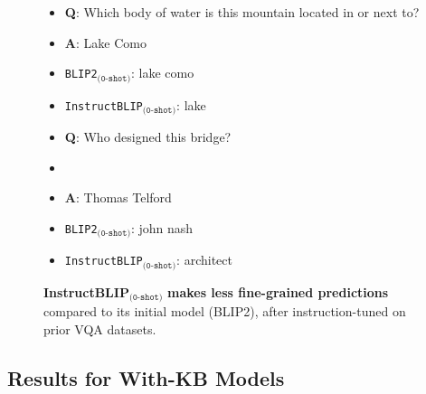 \documentclass[11pt]{article}
\begin{document}
\begin{figure}
  \centering
  \scriptsize
  \begin{minipage}[t]{0.22\textwidth}
    \centering

    \begin{itemize}[nosep, align=left, leftmargin=*,label={}]
      \item \textsf{\textbf{Q}:  Which body of water is this mountain located in or next to?}
      \item \textsf{\textbf{A}:  Lake Como}
      \item \textsf{\texttt{BLIP2}$_\texttt{(0-shot)}$: lake como}
      \item \textsf{\texttt{InstructBLIP}$_\texttt{(0-shot)}$: \textcolor{myred}{lake}}
    \end{itemize}
  \end{minipage}
  \hfill
  \begin{minipage}[t]{0.25\textwidth}
    \centering
    
    \begin{itemize}[nosep, align=left, leftmargin=*,label={}]
      \item \textsf{\textbf{Q}: Who designed this bridge?}
      \item
      \item \textsf{\textbf{A}: Thomas Telford}
      \item \textsf{\texttt{BLIP2}$_\texttt{(0-shot)}$: john nash}
      \item \textsf{\texttt{InstructBLIP}$_\texttt{(0-shot)}$: \textcolor{myred}{architect}}
    \end{itemize}
  \end{minipage}
  \vspace{-2mm}
  \caption{\textbf{InstructBLIP}$_\texttt{(0-shot)}$ \textbf{makes less fine-grained predictions} compared to its initial model (BLIP2), after instruction-tuned on prior VQA datasets.}
  \label{fig:instruct_error}
  \vspace{-4mm}
\end{figure} \subsection{Results for With-KB Models}
\end{document}
